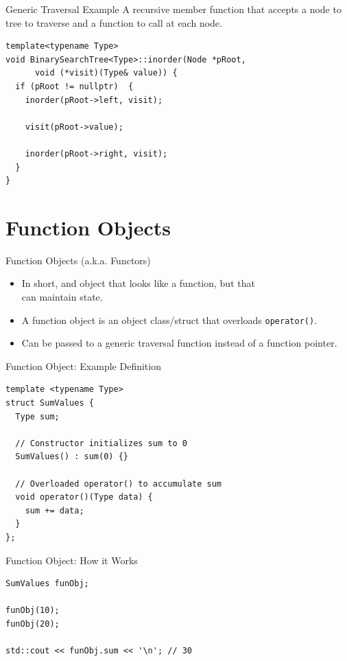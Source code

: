 \documentclass[14pt,aspectratio=1610]{beamer}
\begin{document}
\begin{frame}[fragile]{Generic Traversal Example}
A recursive member function that accepts a node to tree to traverse and a function to call at each node.
\begin{lstlisting}[basicstyle=\ttfamily\small]
template<typename Type>
void BinarySearchTree<Type>::inorder(Node *pRoot,
      void (*visit)(Type& value)) {
  if (pRoot != nullptr)  {
    inorder(pRoot->left, visit);

    visit(pRoot->value);

    inorder(pRoot->right, visit);
  }
}
\end{lstlisting}
\end{frame}

\section{Function Objects}
\begin{frame}{Function Objects (a.k.a. Functors)}
  \begin{itemize}[<+->]
    \item
      In short, and object that looks like a function, but that\\
      can maintain state.
    \item
      A function object is an object class/struct that overloads \lstinline{operator()}.
    \item
      Can be passed to a generic traversal function instead of a function pointer.
  \end{itemize}
\end{frame}

\begin{frame}[fragile]{Function Object: Example Definition}
\begin{lstlisting}[basicstyle=\ttfamily\small]
template <typename Type>
struct SumValues {
  Type sum;

  // Constructor initializes sum to 0
  SumValues() : sum(0) {}

  // Overloaded operator() to accumulate sum
  void operator()(Type data) {
    sum += data;
  }
};
\end{lstlisting}
\end{frame}

\begin{frame}[fragile]{Function Object: How it Works}
\begin{lstlisting}[basicstyle=\ttfamily\small]
SumValues funObj;

funObj(10);
funObj(20);

std::cout << funObj.sum << '\n'; // 30
\end{lstlisting}
\end{frame}
\end{document}
